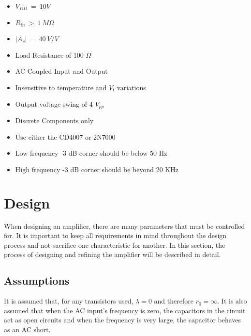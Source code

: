\documentclass{article}
\begin{document}
\begin{itemize}
    \item $V_{DD}\ =\ 10 V$ 
    \item $R_{in}\ >\ 1\ M\Omega$
    \item $|A_v|\ =\ 40\ V/V$
    \item Load Resistance of 100 $\Omega$
    \item AC Coupled Input and Output
    \item Insensitive to temperature and $V_t$ variations
    \item Output voltage swing of 4 $V_{pp}$
    \item Discrete Components only
    \item Use either the CD4007 or 2N7000
    \item Low frequency -3 dB corner should be below 50 Hz
    \item High frequency -3 dB corner should be beyond 20 KHz
\end{itemize}
\pagebreak
\section{Design}
\quad \quad When designing an amplifier, there are many parameters that must be controlled for. It is important to keep all requirements in mind throughout the design process and not sacrifice one characteristic for another. In this section, the process of designing and refining the amplifier will be described in detail.
    \subsection{Assumptions}
    It is assumed that, for any transistors used, $\lambda = 0$ and therefore $r_0 = \infty.$ It is also assumed that when the AC input's frequency is zero, the capacitors in the circuit act as open circuits and when the frequency is very large, the capacitor behaves as an AC short. 
\end{document}
